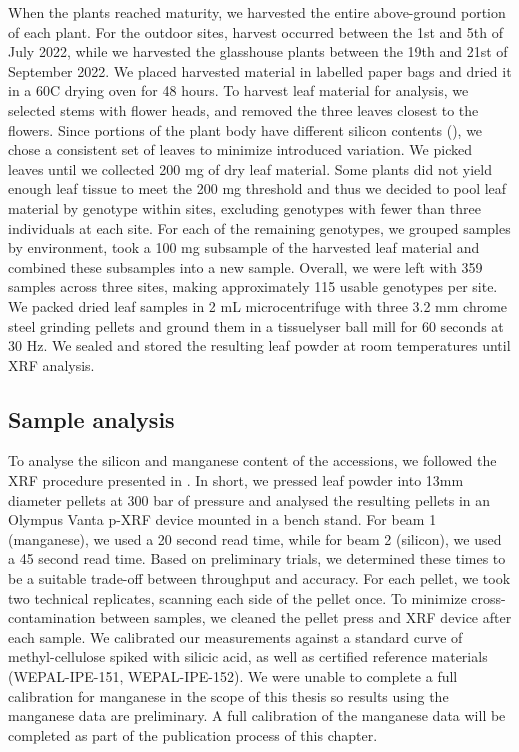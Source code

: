 \documentclass[12pt, letterpaper]{report}
\begin{document}
When the plants reached maturity, we harvested the entire above-ground portion of each plant. For the outdoor sites, harvest occurred between the 1st and 5th of July 2022, while we harvested the glasshouse plants between the 19th and 21st of September 2022. We placed harvested material in labelled paper bags and dried it in a 60\degree C drying oven for 48 hours. To harvest leaf material for analysis, we selected stems with flower heads, and removed the three leaves closest to the flowers. Since portions of the plant body have different silicon contents (\cite{dai_genetic_2005}), we chose a consistent set of leaves to minimize introduced variation. We picked leaves until we collected 200 mg of dry leaf material. Some plants did not yield enough leaf tissue to meet the 200 mg threshold and thus we decided to pool leaf material by genotype within sites, excluding genotypes with fewer than three individuals at each site. For each of the remaining genotypes, we grouped samples by environment, took a 100 mg subsample of the harvested leaf material and combined these subsamples into a new sample. Overall, we were left with 359 samples across three sites, making approximately 115 usable genotypes per site. We packed dried leaf samples in 2 mL microcentrifuge with three 3.2 mm chrome steel grinding pellets and ground them in a tissuelyser ball mill for 60 seconds at 30 Hz. We sealed and stored the resulting leaf powder at room temperatures until XRF analysis. 
  

\subsection{Sample analysis}

To analyse the silicon and manganese content of the accessions, we followed the XRF procedure presented in \textcite{reidinger_rapid_2012}. In short, we pressed leaf powder into 13mm diameter pellets at 300 bar of pressure and analysed the resulting pellets in an Olympus Vanta p-XRF device mounted in a bench stand. For beam 1 (manganese), we used a 20 second read time, while for beam 2 (silicon), we used a 45 second read time. Based on preliminary trials, we determined these times to be a suitable trade-off between throughput and accuracy. For each pellet, we took two technical replicates, scanning each side of the pellet once. To minimize cross-contamination between samples, we cleaned the pellet press and XRF device after each sample. We calibrated our measurements against a standard curve of methyl-cellulose spiked with silicic acid, as well as certified reference materials (WEPAL-IPE-151, WEPAL-IPE-152). We were unable to complete a full calibration for manganese in the scope of this thesis so results using the manganese data are preliminary. A full calibration of the manganese data will be completed as part of the publication process of this chapter.
\end{document}

